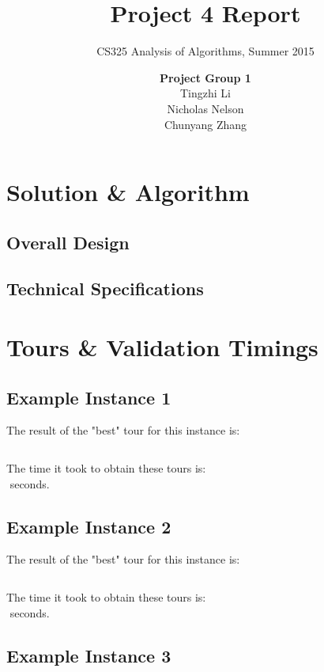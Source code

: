 \documentclass[11pt]{scrreprt}
\title{\textbf{Project 4 Report}}
\subtitle{CS325 Analysis of Algorithms, Summer 2015}
\author{\textsf{\textbf{Project Group 1}}\\
		\textsf{Tingzhi Li}\\
		\textsf{Nicholas Nelson}\\
		\textsf{Chunyang Zhang}}
\date{}
\begin{document}
\maketitle

\chapter{Solution \& Algorithm}
\section{Overall Design}

\section{Technical Specifications}

\chapter{Tours \& Validation Timings}
\section{Example Instance 1}

The result of the "best" tour for this instance is:\\

\begin{lstlisting}[basicstyle=\small,language=c]

\end{lstlisting}

The time it took to obtain these tours is:\\
$ $ seconds.

\section{Example Instance 2}

The result of the "best" tour for this instance is:\\

\begin{lstlisting}[basicstyle=\small,language=c]

\end{lstlisting}

The time it took to obtain these tours is:\\
$ $ seconds.

\section{Example Instance 3}
\end{document}
